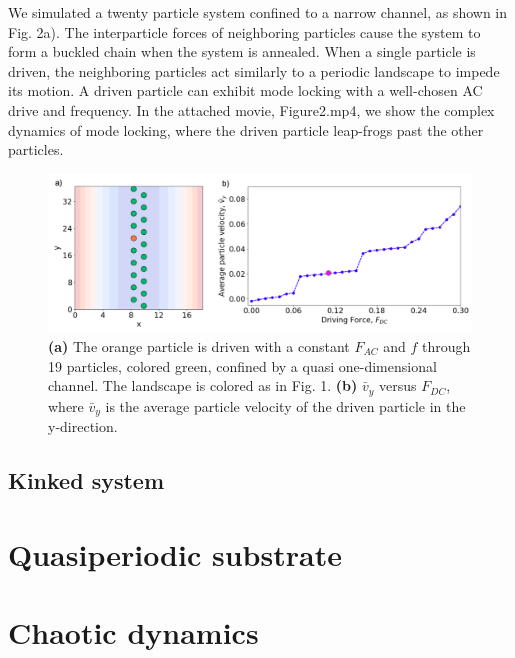 \documentclass[prb,preprint]{revtex4}
\begin{document}
We simulated a twenty particle system confined to a narrow channel, as shown in Fig. 2a). The interparticle forces of neighboring particles cause the system to form a buckled chain when the system is annealed. When a single particle is driven, the neighboring particles act similarly to a periodic landscape to impede its motion. A driven particle can exhibit mode locking with a well-chosen AC drive and frequency. In the attached movie, Figure2.mp4, we show the complex dynamics of mode locking, where the driven particle leap-frogs past the other particles. 

\begin{center}
\begin{figure}[h!]
\centering
\includegraphics[scale=.40]{twenty}
\caption{\textbf{(a)} The orange particle is driven with a constant $F_{AC}$ and $f$ through 19 particles, colored green, confined by a quasi one-dimensional channel. The landscape is colored as in Fig. 1. \textbf{(b)} $\bar{v}_{y}$ versus $F_{DC}$, where $\bar{v}_{y}$ is the average particle velocity of the driven particle in the y-direction.}
\end{figure}
\end{center}

\subsection{Kinked system}
\label{DispEqSection}	%




\section{Quasiperiodic substrate}
\label{sec:quasiperiod}	%

\section{Chaotic dynamics}
\label{sec:chaos}	%
\end{document}
